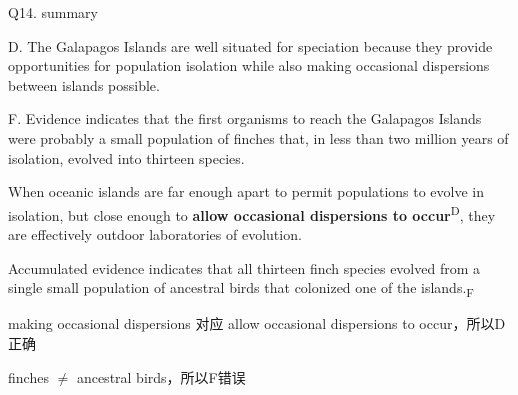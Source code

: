 \begin{blk}
    \begin{qst}
        Q14. summary
    \end{qst}

    \begin{chc}
        D. The Galapagos Islands are well situated for speciation because they provide opportunities for population isolation while also making occasional dispersions between islands possible.

        F. Evidence indicates that the first organisms to reach the Galapagos Islands were probably a small population of finches that, in less than two million years of isolation, evolved into thirteen species.
    \end{chc}

    \begin{psgq}
        When oceanic islands are far enough apart to permit populations to evolve in isolation, but close enough to \textbf{allow occasional dispersions to occur}\textsuperscript{D}, they are effectively outdoor laboratories of evolution.

        Accumulated evidence indicates that all thirteen finch species evolved from a single small population of ancestral birds that colonized one of the islands.\textsubscript{F}
    \end{psgq}

    \begin{nlz}
        making occasional dispersions 对应 allow occasional dispersions to occur，所以D正确

        finches $\neq $ ancestral birds，所以F错误
    \end{nlz}
\end{blk}

\newpage